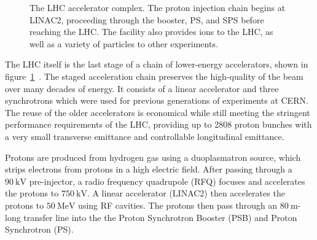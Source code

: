 \begin{figure}[htbp]
	\centering
	\caption{The LHC accelerator complex. The proton injection chain begins at LINAC2, proceeding through the booster, PS, and SPS before reaching the LHC. The facility also provides ions to the LHC, as well as a variety of particles to other experiments.}
	\label{fig:LHC-accelerator-complex}
\end{figure}


The LHC itself is the last stage of a chain of lower-energy accelerators, shown in figure~\ref{fig:LHC-accelerator-complex}~\cite{Benedikt:2004wm}. The staged acceleration chain preserves the high-quality of the beam over many decades of energy. It consists of a linear accelerator and three synchrotrons which were used for previous generations of experiments at CERN. The reuse of the older accelerators is economical while still meeting the stringent performance requirements of the LHC, providing up to 2808 proton bunches with a very small transverse emittance and controllable longitudinal emittance. 

Protons are produced from hydrogen gas using a duoplasmatron source, which strips electrons from protons in a high electric field. After passing through a $\SI{90}{\kilo\volt}$ pre-injector, a radio frequency quadrupole (RFQ) focuses and accelerates the protons to $\SI{750}{\kilo\volt}$. A linear accelerator (LINAC2) then accelerates the protons to $\SI{50}{\mega\electronvolt}$ using RF cavities. The protons then pass through an $\SI{80}{\meter}$-long transfer line into the the Proton Synchrotron Booster (PSB) and Proton Synchrotron (PS). 

